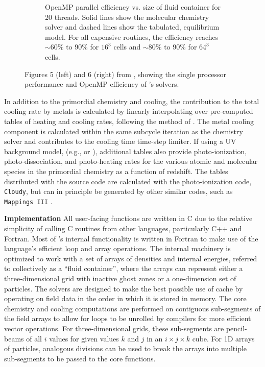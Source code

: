 \begin{figure}[h]
\begin{subfigure}{.42\textwidth}
  \caption{OpenMP parallel efficiency vs. size of fluid container for
    20 threads.  Solid lines show the molecular
    chemistry solver and dashed lines show the tabulated, equilibrium
    model.  For all expensive routines, the efficiency reaches
    $\sim$60\% to 90\% for $16^3$ cells and $\sim$80\% to 90\% for
    $64^3$ cells.}
  \label{fig:openmp}
\end{subfigure}%
\caption{Figures 5 (left) and 6 (right) from
  \citet{2017MNRAS.466.2217S}, showing the single processor
  performance and OpenMP efficiency of \grackle{}'s solvers.}
\label{fig:performance}
\vspace*{-1\baselineskip}
\end{figure}

In addition to the primordial chemistry and cooling, the contribution
to the total cooling rate by metals is calculated by linearly
interpolating over pre-computed tables of heating and cooling rates,
following the method of \citet{2008MNRAS.385.1443S}.
The metal cooling component is calculated within the same subcycle
iteration as the chemistry solver and contributes to the cooling time
time-step limiter.
If using a UV background model, (e.g.,
\citet{2009ApJ...703.1416F} or \citet{2012ApJ...746..125H}),
additional tables also provide photo-ionization, photo-dissociation,
and photo-heating rates for the various atomic and molecular species
in the primordial chemistry as a function of redshift.
The tables distributed with the source code are calculated with the
photo-ionization code, \texttt{Cloudy}, but can in principle be
generated by other similar codes, such as \texttt{Mappings III}
\citep{1993ApJS...88..253S}.

\noindent
{\bf Implementation}
All user-facing \grackle{} functions are written in C due
to the relative simplicity of calling C routines from other
languages, particularly C++ and Fortran.  Most of \grackle{}'s
internal functionality is written in Fortran to make use of the
language's efficient loop and array operations.
The internal machinery is optimized to work with a set of arrays of
densities and internal energies, referred to collectively as a ``fluid
container'', where the arrays can represent either a three-dimensional
grid with inactive ghost zones or a one-dimension set of particles.
The solvers are designed to make the best possible use of cache by
operating on field data in the order in which it is stored in memory.
The core chemistry and cooling computations are performed on
contiguous sub-segments of the field arrays to allow for loops to be
unrolled by compilers for more efficient vector operations.  For
three-dimensional grids, these sub-segments are pencil-beams of all $i$
values for given values $k$ and $j$ in an $i\times j\times k$ cube.
For 1D arrays of particles, analogous divisions can be used to break
the arrays into multiple sub-segments to be passed to the core
functions.

